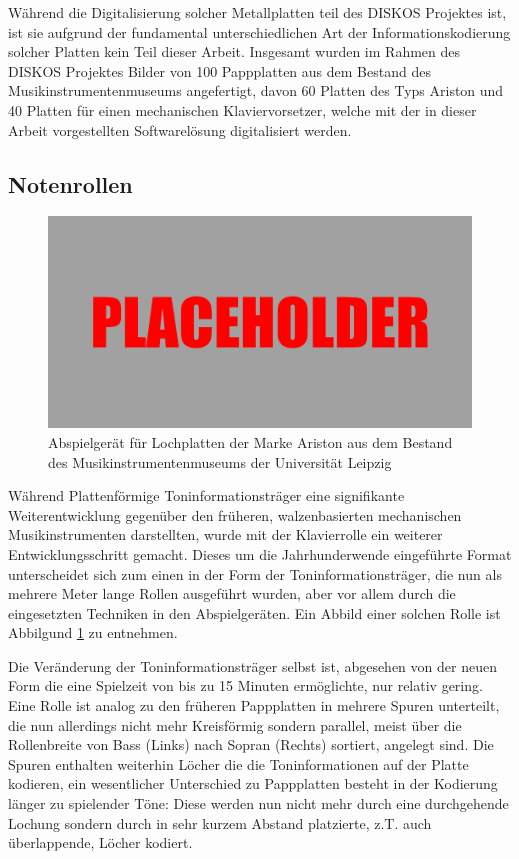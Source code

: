 Während die Digitalisierung solcher Metallplatten teil des DISKOS Projektes ist, ist sie aufgrund der fundamental unterschiedlichen Art der Informationskodierung solcher Platten kein Teil dieser Arbeit.
Insgesamt wurden im Rahmen des DISKOS Projektes Bilder von 100 Pappplatten aus dem Bestand des Musikinstrumentenmuseums angefertigt, davon 60 Platten des Typs Ariston und 40 Platten für einen mechanischen Klaviervorsetzer, welche mit der in dieser Arbeit vorgestellten Softwarelösung digitalisiert werden.

\subsection{Notenrollen}

\begin{figure}[t]
    \centering
    \includegraphics[width=\textwidth]{graphics/placeholder.png}
    \caption{Abspielgerät für Lochplatten der Marke Ariston aus dem Bestand des Musikinstrumentenmuseums der Universität Leipzig}
    \label{pianoroll}
\end{figure}

Während Plattenförmige Toninformationsträger eine signifikante Weiterentwicklung gegenüber den früheren, walzenbasierten mechanischen Musikinstrumenten darstellten, wurde mit der Klavierrolle ein weiterer Entwicklungsschritt gemacht.
Dieses um die Jahrhunderwende eingeführte Format unterscheidet sich zum einen in der Form der Toninformationsträger, die nun als mehrere Meter lange Rollen ausgeführt wurden, aber vor allem durch die eingesetzten Techniken in den Abspielgeräten.
Ein Abbild einer solchen Rolle ist Abbilgund \ref{pianoroll} zu entnehmen.

Die Veränderung der Toninformationsträger selbst ist, abgesehen von der neuen Form die eine Spielzeit von bis zu 15 Minuten ermöglichte, nur relativ gering.
Eine Rolle ist analog zu den früheren Pappplatten in mehrere Spuren unterteilt, die nun allerdings nicht mehr Kreisförmig sondern parallel, meist über die Rollenbreite von Bass (Links) nach Sopran (Rechts) sortiert, angelegt sind.
Die Spuren enthalten weiterhin Löcher die die Toninformationen auf der Platte kodieren, ein wesentlicher Unterschied zu Pappplatten besteht in der Kodierung länger zu spielender Töne: Diese werden nun nicht mehr durch eine durchgehende Lochung sondern durch in sehr kurzem Abstand platzierte, z.T. auch überlappende, Löcher kodiert.

